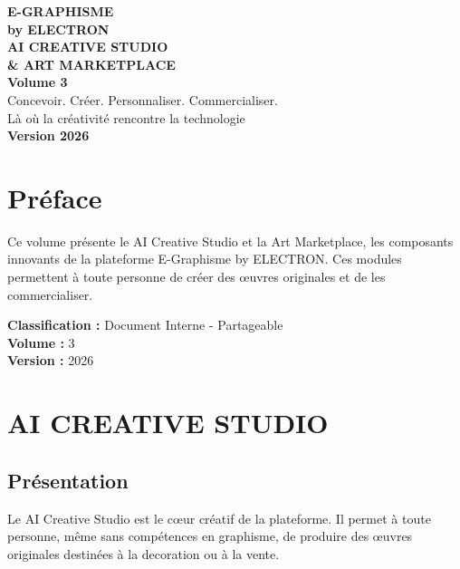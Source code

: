 \documentclass[12pt,a4paper,oneside]{book}
\begin{document}
\begin{titlepage}
\thispagestyle{empty}
\begin{center}
\vspace*{2cm}
{\Huge\bfseries\color{electronblue}E-GRAPHISME}\\[0.3cm]
{\LARGE\bfseries\color{electronpurple}by ELECTRON}\\[2cm]
\vspace{2cm}
{\huge\bfseries\color{darkbg}AI CREATIVE STUDIO}\\[0.3cm]
{\huge\bfseries\color{darkbg}\& ART MARKETPLACE}\\[1cm]
{\Large\bfseries\color{electroncyan}Volume 3}\\[3cm]
\vspace{2cm}
{\Large\color{mediumgray}Concevoir. Créer. Personnaliser. Commercialiser.}\\[1cm]
{\Large\color{mediumgray}Là où la créativité rencontre la technologie}\\[3cm]
{\Large\bfseries\color{electrongold}Version 2026}\\[2cm]
\vfill
\end{center}
\end{titlepage}

\frontmatter

\chapter*{Préface}
Ce volume présente le AI Creative Studio et la Art Marketplace, les composants innovants de la plateforme E-Graphisme by ELECTRON. Ces modules permettent à toute personne de créer des œuvres originales et de les commercialiser.

\bigskip
\textbf{Classification :} Document Interne - Partageable\\
\textbf{Volume :} 3\\
\textbf{Version :} 2026

\tableofcontents

\mainmatter

\chapter{AI CREATIVE STUDIO}

\section{Présentation}
Le AI Creative Studio est le cœur créatif de la plateforme. Il permet à toute personne, même sans compétences en graphisme, de produire des œuvres originales destinées à la decoration ou à la vente.
\end{document}
